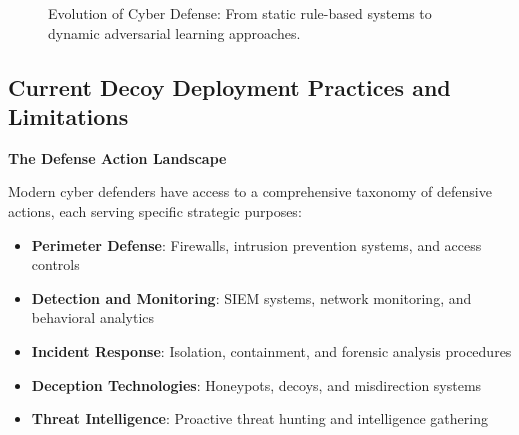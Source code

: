 \documentclass[12pt]{article}
\theoremstyle{definition}
\theoremstyle{plain}
\begin{document}
\begin{figure}[H]
\centering
{}
\caption{Evolution of Cyber Defense: From static rule-based systems to dynamic adversarial learning approaches.}
\label{fig:defense_evolution}
\end{figure}

\subsection{Current Decoy Deployment Practices and Limitations}

\textbf{The Defense Action Landscape}

Modern cyber defenders have access to a comprehensive taxonomy of defensive actions, each serving specific strategic purposes:

\begin{itemize}
    \item \textbf{Perimeter Defense}: Firewalls, intrusion prevention systems, and access controls
    \item \textbf{Detection and Monitoring}: SIEM systems, network monitoring, and behavioral analytics
    \item \textbf{Incident Response}: Isolation, containment, and forensic analysis procedures
    \item \textbf{Deception Technologies}: Honeypots, decoys, and misdirection systems
    \item \textbf{Threat Intelligence}: Proactive threat hunting and intelligence gathering
\end{itemize}
\end{document}
